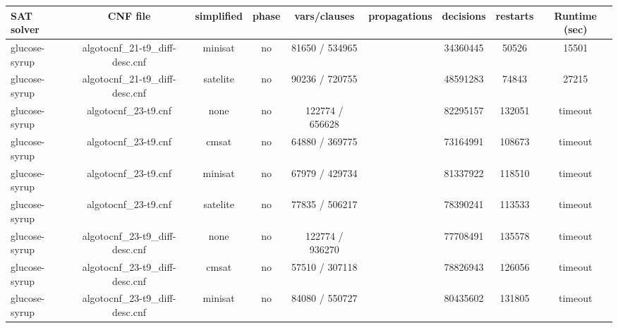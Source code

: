 \begin{appendices}
\begin{table}[p]
  \begin{center}
    \begin{tabular}{l|cccccccc}
        \textbf{SAT solver} & \textbf{CNF file} & \textbf{simplified} & \textbf{phase} & \textbf{vars/clauses} & \textbf{propagations} & \textbf{decisions} & \textbf{restarts} & \textbf{Runtime (sec)} \\
      \hline
  glucose-syrup                  & algotocnf\_21-t9\_diff-desc.cnf & minisat    & no    & 81650 / 534965 &           & 34360445  & 50526      & 15501 \\ %
  glucose-syrup                  & algotocnf\_21-t9\_diff-desc.cnf & satelite   & no    & 90236 / 720755 &           & 48591283  & 74843      & 27215 \\ %
  glucose-syrup                  & algotocnf\_23-t9.cnf           & none       & no    & 122774 / 656628 &           & 82295157  & 132051     & timeout \\ %
  glucose-syrup                  & algotocnf\_23-t9.cnf           & cmsat      & no    & 64880 / 369775 &           & 73164991  & 108673     & timeout \\ %
  glucose-syrup                  & algotocnf\_23-t9.cnf           & minisat    & no    & 67979 / 429734 &           & 81337922  & 118510     & timeout \\ %
  glucose-syrup                  & algotocnf\_23-t9.cnf           & satelite   & no    & 77835 / 506217 &           & 78390241  & 113533     & timeout \\ %
  glucose-syrup                  & algotocnf\_23-t9\_diff-desc.cnf & none       & no    & 122774 / 936270 &           & 77708491  & 135578     & timeout \\ %
  glucose-syrup                  & algotocnf\_23-t9\_diff-desc.cnf & cmsat      & no    & 57510 / 307118 &           & 78826943  & 126056     & timeout \\ %
  glucose-syrup                  & algotocnf\_23-t9\_diff-desc.cnf & minisat    & no    & 84080 / 550727 &           & 80435602  & 131805     & timeout \\ %

\end{tabular}
\end{center}
\end{table}
\end{appendices}
